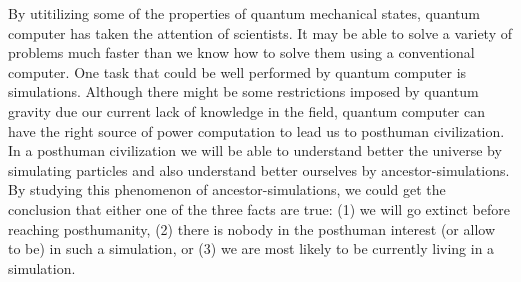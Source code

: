 \documentclass[twoside,11pt]{article}
\begin{document}
By utitilizing some of the properties of quantum mechanical states, quantum computer has taken the attention of scientists.
It may be able to solve a variety of problems much faster than we know how to solve them using a conventional computer.
One task that could be well performed by quantum computer is simulations.
Although there might be some restrictions imposed by quantum gravity due our current lack of knowledge in the field, quantum computer can have the right source of power computation to lead us to posthuman civilization.
In a posthuman civilization we will be able to understand better the universe by simulating particles and also understand better ourselves by ancestor-simulations.
By studying this phenomenon of ancestor-simulations, we could get the conclusion that either one of the three facts are true: (1) we will go extinct before reaching posthumanity, (2) there is nobody in the posthuman interest (or allow to be) in such a simulation, or (3) we are most likely to be currently living in a simulation.

\vskip 0.2in

\end{document}
